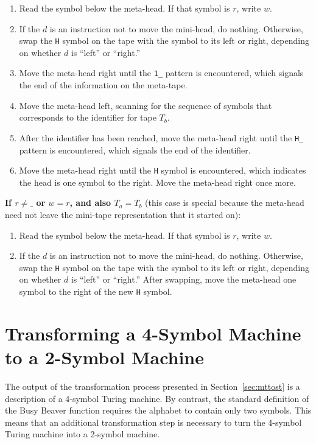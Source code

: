 \begin{enumerate}

\item Read the symbol below the meta-head. If that symbol is $r$, write $w$.
\item If the $d$ is an instruction not to move the mini-head, do nothing. Otherwise, swap the \texttt{H} symbol on the tape with the symbol to its left or right, depending on whether $d$ is ``left'' or ``right.''
\item Move the meta-head right until the \texttt{1\_} pattern is encountered, which signals the end of the information on the meta-tape.
\item Move the meta-head left, scanning for the sequence of symbols that corresponds to the identifier for tape $T_b$.
\item After the identifier has been reached, move the meta-head right until the \texttt{H\_} pattern is encountered, which signals the end of the identifier.
\item Move the meta-head right until the \texttt{H} symbol is encountered, which indicates the head is one symbol to the right. Move the meta-head right once more.

\end{enumerate}

\textbf{If $r \not= \texttt{\_}$ or $w = r$, and also $T_a = T_b$} (this case is special because the meta-head need not leave the mini-tape representation that it started on):
\begin{enumerate}

\item Read the symbol below the meta-head. If that symbol is $r$, write $w$.
\item If the $d$ is an instruction not to move the mini-head, do nothing. Otherwise, swap the \texttt{H} symbol on the tape with the symbol to its left or right, depending on whether $d$ is ``left'' or ``right.'' After swapping, move the meta-head one symbol to the right of the new \texttt{H} symbol.

\end{enumerate}

\section{Transforming a 4-Symbol Machine to a 2-Symbol Machine \label{sec:mstots}}

The output of the transformation process presented in Section~\ref{sec:mttost} is a description of a 4-symbol Turing machine. By contrast, the standard definition of the Busy Beaver function requires the alphabet to contain only two symbols. This means that an additional transformation step is necessary to turn the 4-symbol Turing machine into a 2-symbol machine. \\

